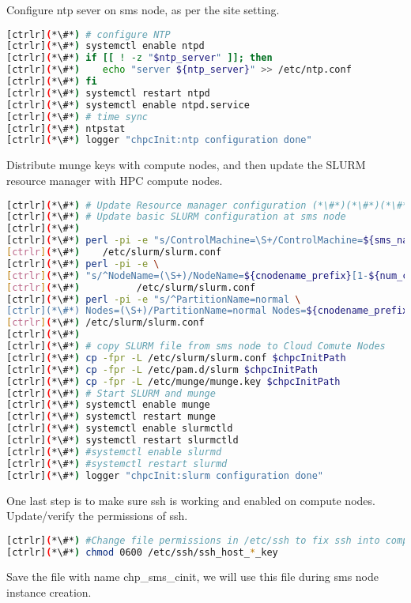 	Configure ntp sever on sms node, as per the site setting.


\begin{lstlisting}[language=bash,keywords={}]
[ctrlr](*\#*) # configure NTP
[ctrlr](*\#*) systemctl enable ntpd
[ctrlr](*\#*) if [[ ! -z "$ntp_server" ]]; then
[ctrlr](*\#*)    echo "server ${ntp_server}" >> /etc/ntp.conf
[ctrlr](*\#*) fi
[ctrlr](*\#*) systemctl restart ntpd
[ctrlr](*\#*) systemctl enable ntpd.service
[ctrlr](*\#*) # time sync
[ctrlr](*\#*) ntpstat
[ctrlr](*\#*) logger "chpcInit:ntp configuration done"
\end{lstlisting} 

	Distribute munge keys with compute nodes, and then update the SLURM resource manager with HPC compute nodes.



\begin{lstlisting}[language=bash,keywords={}]
[ctrlr](*\#*) # Update Resource manager configuration (*\#*)(*\#*)(*\#*)
[ctrlr](*\#*) # Update basic SLURM configuration at sms node
[ctrlr](*\#*)
[ctrlr](*\#*) perl -pi -e "s/ControlMachine=\S+/ControlMachine=${sms_name}/" \
[ctrlr](*\#*)    /etc/slurm/slurm.conf
[ctrlr](*\#*) perl -pi -e \
[ctrlr](*\#*) "s/^NodeName=(\S+)/NodeName=${cnodename_prefix}[1-${num_ccomputes}]/" \
[ctrlr](*\#*)          /etc/slurm/slurm.conf
[ctrlr](*\#*) perl -pi -e "s/^PartitionName=normal \
[ctrlr](*\#*) Nodes=(\S+)/PartitionName=normal Nodes=${cnodename_prefix}[1-${num_ccomputes}]/" \
[ctrlr](*\#*) /etc/slurm/slurm.conf
[ctrlr](*\#*)
[ctrlr](*\#*) # copy SLURM file from sms node to Cloud Comute Nodes
[ctrlr](*\#*) cp -fpr -L /etc/slurm/slurm.conf $chpcInitPath
[ctrlr](*\#*) cp -fpr -L /etc/pam.d/slurm $chpcInitPath
[ctrlr](*\#*) cp -fpr -L /etc/munge/munge.key $chpcInitPath
[ctrlr](*\#*) # Start SLURM and munge 
[ctrlr](*\#*) systemctl enable munge
[ctrlr](*\#*) systemctl restart munge
[ctrlr](*\#*) systemctl enable slurmctld
[ctrlr](*\#*) systemctl restart slurmctld
[ctrlr](*\#*) #systemctl enable slurmd
[ctrlr](*\#*) #systemctl restart slurmd
[ctrlr](*\#*) logger "chpcInit:slurm configuration done"
\end{lstlisting} 


	One last step is to make sure ssh is working and enabled on compute nodes. Update/verify the permissions of ssh.


\begin{lstlisting}[language=bash,keywords={}]
[ctrlr](*\#*) #Change file permissions in /etc/ssh to fix ssh into compute node
[ctrlr](*\#*) chmod 0600 /etc/ssh/ssh_host_*_key
\end{lstlisting} 

	Save the file with name chp\_sms\_cinit, we will use this file during sms node instance creation.

